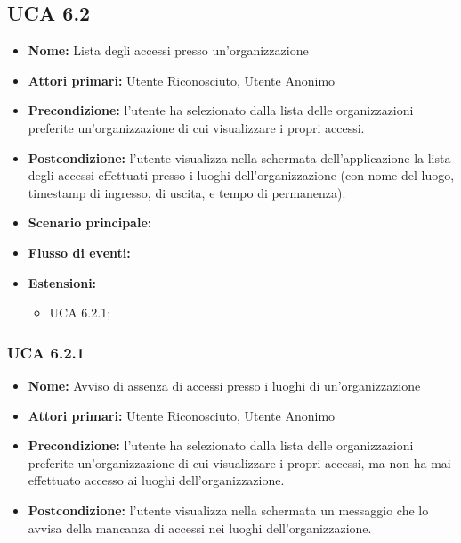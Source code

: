 \subsection{UCA 6.2}
\begin{itemize}
    \item \textbf{Nome:} Lista degli accessi presso un'organizzazione
    \item \textbf{Attori primari:} Utente Riconosciuto, Utente Anonimo
    \item \textbf{Precondizione:} l'utente ha selezionato dalla lista delle organizzazioni preferite un'organizzazione di cui visualizzare i propri accessi.
    \item \textbf{Postcondizione:} l’utente visualizza nella schermata dell’applicazione la lista degli accessi effettuati presso i luoghi dell’organizzazione (con nome del luogo, timestamp di ingresso, di uscita, e tempo di permanenza).
    \item \textbf{Scenario principale:} %
    \item \textbf{Flusso di eventi:} %
    \item \textbf{Estensioni:}
    \begin{itemize}
        \item UCA 6.2.1;
    \end{itemize}
\end{itemize}

\subsubsection{UCA 6.2.1}
\begin{itemize}
    \item \textbf{Nome:} Avviso di assenza di accessi presso i luoghi di un’organizzazione
    \item \textbf{Attori primari:} Utente Riconosciuto, Utente Anonimo
    \item \textbf{Precondizione:} l'utente ha selezionato dalla lista delle organizzazioni preferite un'organizzazione di cui visualizzare i propri accessi, ma non ha mai effettuato accesso ai luoghi dell'organizzazione.
    \item \textbf{Postcondizione:} l'utente visualizza nella schermata un messaggio che lo avvisa della mancanza di accessi nei luoghi dell'organizzazione.
\end{itemize}

